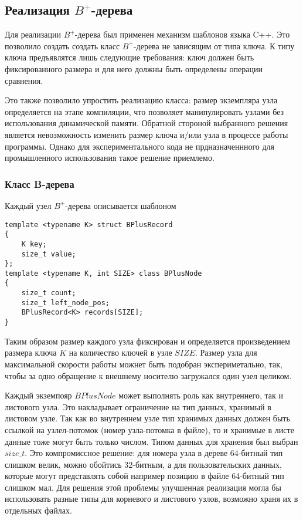 \documentclass[14pt, russian]{scrartcl}
\begin{document}
\subsection{Реализация $B^+$-дерева}

Для реализации $B^+$-дерева был применен механизм шаблонов языка C++. Это позволило создать создать класс 
$B^+$-дерева не зависящим от типа ключа. К типу ключа предъявлятся лишь следующие требования: ключ должен быть фиксированного размера и для него должны быть определены операции сравнения.

Это также позволило упростить реализацию класса: размер экземпляра узла определяется на этапе компиляции, что позволяет манипулировать узлами без использования динамической памяти. Обратной стороной выбранного решения является невозможность изменить размер ключа и/или узла в процессе работы программы. Однако для экспериментального кода не прдназначеннного для промышленного использования такое решение приемлемо. 

\subsubsection{Класс B-дерева}

Каждый узел $B^+$-дерева описывается шаблоном 

\begin{verbatim}
template <typename K> struct BPlusRecord
{
    K key;
    size_t value;
};
template <typename K, int SIZE> class BPlusNode
{
    size_t count;
    size_t left_node_pos;
    BPlusRecord<K> records[SIZE];
}
\end{verbatim}

Таким образом размер каждого узла фиксирован и определяется произведением размера ключа $K$ на количество
ключей в узле $SIZE$. Размер узла для максимальной скорости работы можнет быть подобран экспериметально, так, чтобы за одно обращение к внешнему носителю загружался один узел целиком.

Каждый экземпояр $BPlusNode$ может выполнять роль как внутреннего, так и листового узла. Это накладывает ограничение
на тип данных, хранимый в листовом узле. Так как во внутреннем узле тип хранимых данных должен быть ссылкой на узлел-потомок (номер узла-потомка в файле), то и хранимые в листе данные тоже могут быть только числом. Типом данных для хранения был выбран $size\_t$. Это компромиссное решение: для номера узла в дереве 64-битный тип слишком велик, можно обойтись 32-битным, а для пользовательских данных, которые могут представлять собой например позицию в файле 64-битный тип слишком мал. Для решения этой проблемы улучшенная реализация могла бы использовать разные типы для корневого и листового узлов, возможно храня их в отдельных файлах.
\end{document}
